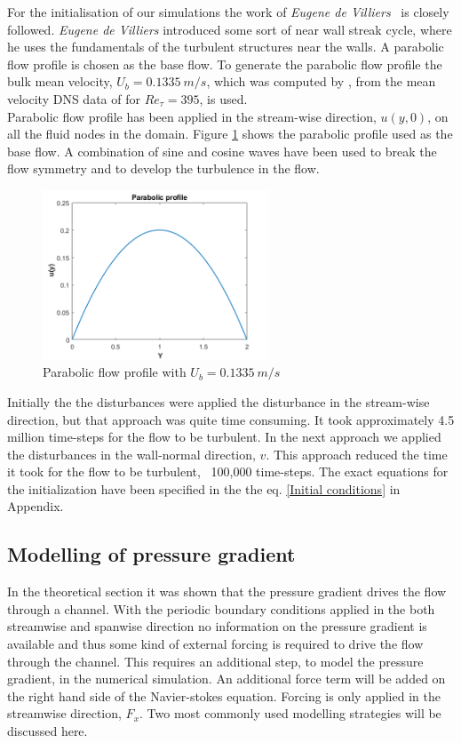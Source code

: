 For the initialisation of our simulations the work of \emph{Eugene de Villiers}~\cite{devilliers:phd} is closely followed. \emph{Eugene de Villiers} introduced some sort of near wall streak cycle, where he uses the fundamentals of the turbulent structures near the walls. A parabolic flow profile is chosen as the base flow. To generate the parabolic flow profile the bulk mean velocity, $U_b = 0.1335\ m/s$, which was computed by \cite{devilliers:phd}, from the mean velocity DNS data of \cite{moser:kim:mansour:99} for $Re_\tau = 395$, is used.\\

Parabolic flow profile has been applied in the stream-wise direction, $u(y,0)$,  on all the fluid nodes in the domain. Figure \ref{para profile} shows the parabolic profile used as the base flow. A combination of sine and cosine waves have been used to break the flow symmetry and to develop the turbulence in the flow. 
%
\begin{figure}[h]
    \centering
    \includegraphics[width=0.6\textwidth]{figur/Parabolic_profile.png}
    \caption{Parabolic flow profile with $U_b = 0.1335\ m/s$}
    \label{para profile}
\end{figure}
%
Initially the the disturbances were applied the disturbance in the stream-wise direction, but that approach was quite time consuming. It took approximately 4.5 million time-steps for the flow to be turbulent. In the next approach we applied the disturbances in the wall-normal direction, $v$. This approach reduced the time it took for the flow to be turbulent, ~100,000 time-steps. The exact equations for the initialization have been specified in the the eq. \ref{Initial conditions} in Appendix.

\subsection{Modelling of pressure gradient}
In the theoretical section it was shown that the pressure gradient drives the flow through a channel. With the periodic boundary conditions applied in the both streamwise and spanwise direction no information on the pressure gradient is available and thus some kind of external forcing is required to drive the flow through the channel. This requires an additional step, to model the pressure gradient, in the numerical simulation. An additional force term will be added on the right hand side of the Navier-stokes equation. Forcing is only applied in the streamwise direction, $F_x$. Two most commonly used modelling strategies will be discussed here.

